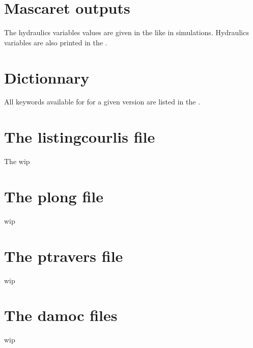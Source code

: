\section{Mascaret outputs}
The hydraulics variables values are given in the  like in \mascaret simulations. 
Hydraulics variables are also printed in the .  

\section{Dictionnary}
All keywords available for \courlis for a given version are listed in the .

\section{The listingcourlis file}\label{listing_courlis}

The  
wip

\section{The plong file}\label{plong}
wip

\section{The ptravers file}\label{ptravers}
wip

\section{The damoc files}
wip

